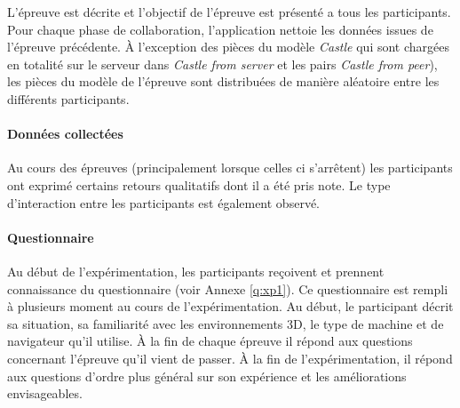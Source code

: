 L'épreuve est décrite et l'objectif de l'épreuve est présenté a tous les participants.
Pour chaque phase de collaboration, l'application nettoie les données issues de 
l'épreuve précédente. 
À l'exception des pièces du modèle \textit{Castle} qui sont chargées
en totalité sur le serveur dans \textit{Castle from server} et les pairs \textit{Castle 
from peer}), les pièces du modèle de l'épreuve sont distribuées de manière 
aléatoire entre les différents participants.

\paragraph{Données collectées}
Au cours des épreuves (principalement lorsque celles ci s'arrêtent)  les 
participants ont exprimé certains retours qualitatifs dont il a été pris note. Le type 
d'interaction entre les participants est également observé.

\paragraph{Questionnaire}
Au début de l'expérimentation, les participants reçoivent et prennent connaissance 
du questionnaire (voir Annexe \ref{q:xp1}). Ce questionnaire est rempli à plusieurs 
moment au cours de l'expérimentation. Au début, le participant décrit sa situation, 
sa familiarité avec les environnements 3D, le type de machine et de navigateur 
qu'il utilise. À la fin de chaque épreuve il répond aux questions concernant 
l'épreuve qu'il vient de passer. À la fin de l'expérimentation, il répond aux 
questions d'ordre plus général sur son expérience et les améliorations 
envisageables.
